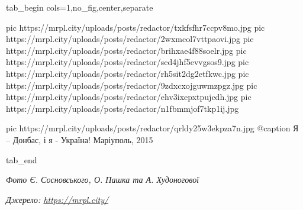  
 
 
 
 

\ifcmt
  tab_begin cols=1,no_fig,center,separate

     pic https://mrpl.city/uploads/posts/redactor/txkfsfhr7ccpv8mo.jpg
		 pic https://mrpl.city/uploads/posts/redactor/2wxmcol7vttpaovi.jpg
		 pic https://mrpl.city/uploads/posts/redactor/brihxae4f88soelr.jpg
		 pic https://mrpl.city/uploads/posts/redactor/scd4jhf5evvgsos9.jpg
		 pic https://mrpl.city/uploads/posts/redactor/rh5sit2dg2etfkwc.jpg
		 pic https://mrpl.city/uploads/posts/redactor/9zdxcxojguwmzpgz.jpg
		 pic https://mrpl.city/uploads/posts/redactor/ehv3ixepxtpujcdh.jpg
		 pic https://mrpl.city/uploads/posts/redactor/n1fbmmjof7tkp1ij.jpg

		 pic https://mrpl.city/uploads/posts/redactor/qrldy25w3ekpza7n.jpg
		 @caption Я – Донбас, і я - Україна! Маріуполь, 2015

  tab_end
\fi

\emph{Фото Є. Сосновського, О. Пашка та А. Худоногової}

\emph{Джерело: \url{https://mrpl.city/}}
